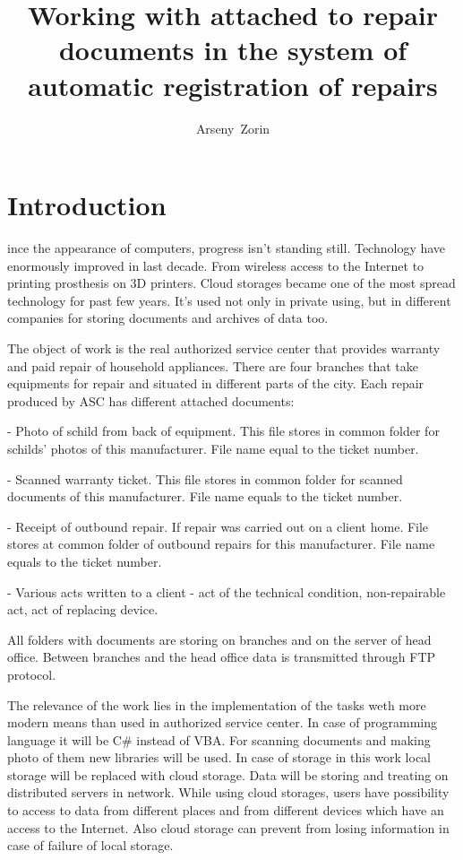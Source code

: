 \documentclass[12pt,journal,compsoc]{C:/Users/zorin/Downloads/bare_conf/IEEEtran}
\begin{document}
\title{Working with attached to repair documents in the system of automatic registration of repairs}

\author{Arseny~Zorin}
\maketitle

\IEEEpeerreviewmaketitle



\section{Introduction}
ince the appearance of computers, progress isn't standing still. Technology have enormously improved in last decade. From wireless access to the Internet to printing prosthesis on 3D printers. Cloud storages became one of the most spread technology for past few years. It's used not only in private using, but in different companies for storing documents and archives of data too.

The object of work is the real authorized service center that provides warranty and paid repair of household appliances. There are four branches that take equipments for repair and situated in different parts of the city. Each repair produced by ASC has different attached documents:

  - Photo of schild from back of equipment. This file stores in common folder for schilds' photos of this manufacturer. File name equal to the ticket number.

- Scanned warranty ticket. This file stores in common folder for scanned documents of this manufacturer. File name equals to the ticket number.

- Receipt of outbound repair. If repair was carried out on a client home. File stores at common folder of outbound repairs for this manufacturer. File name equals to the ticket number.

- Various acts written to a client - act of the technical condition, non-repairable act, act of replacing device.

All folders with documents are storing on branches and on the server of head office. Between branches and the head office data is transmitted through FTP protocol.

The relevance of the work lies in the implementation of the tasks weth more modern means than used in authorized service center. In case of programming language it will be C\# instead of VBA. For scanning documents and making photo of them new libraries will be used. In case of storage in this work local storage will be replaced with cloud storage. Data will be storing and treating on distributed servers in network. While using cloud storages, users have possibility to access to data from different places and from different devices which have an access to the Internet. Also cloud storage can prevent from losing information in case of failure of local storage.
\end{document}
